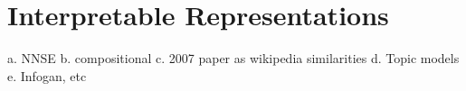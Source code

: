 \section{Interpretable Representations}\label{ch2:Interpretability}
a. NNSE
b. compositional
c. 2007 paper as wikipedia similarities
d. Topic models\label{bg:TopicModel}
e. Infogan, etc



